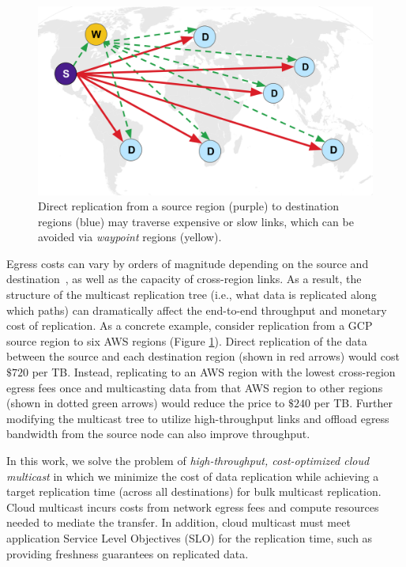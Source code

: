 \begin{figure}[t]
     \centering
     \includegraphics[width=0.8\linewidth]{figures/overview.pdf}
     \caption{Direct replication from a source region (purple) to destination regions (blue) may traverse expensive or slow links, which can be avoided via \textit{waypoint} regions (yellow).}
     \label{fig:overview}
\end{figure}


Egress costs can vary by orders of magnitude depending on the source and destination~\cite{cloudflareegress}, as well as the capacity of cross-region links.
As a result, the structure of the multicast replication tree (i.e., what data is replicated along which paths) can dramatically affect the end-to-end throughput and monetary cost of replication.
%
As a concrete example, consider replication from a GCP source region to six AWS regions (Figure \ref{fig:overview}).
%
Direct replication of the data between the source and each destination region (shown in red arrows) would cost $\$720$ per TB. 
%
Instead, replicating to an AWS region with the lowest cross-region egress fees once and multicasting data from that AWS region to other regions (shown in dotted green arrows) would reduce the price to $\$240$ per TB.
%
Further modifying the multicast tree to utilize high-throughput links and offload egress bandwidth from the source node can also improve throughput.

In this work, we solve the problem of \emph{high-throughput, cost-optimized cloud multicast} in which we minimize the cost of data replication while achieving a target replication time (across all destinations) for bulk multicast replication.
%
Cloud multicast incurs costs from network egress fees and compute resources needed to mediate the transfer.
%
In addition, cloud multicast must meet application Service Level Objectives (SLO) for the replication time, such as providing freshness guarantees on replicated data.

